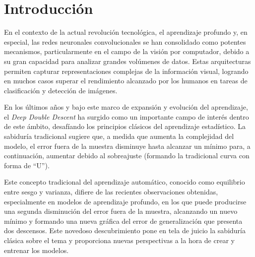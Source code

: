 %


\chapter{Introducción}

En el contexto de la actual revolución tecnológica, el aprendizaje profundo y, en especial, las redes neuronales convolucionales se han consolidado como potentes mecanismos, particularmente en el campo de la visión por computador, debido a su gran capacidad para analizar grandes volúmenes de datos. Estas arquitecturas permiten capturar representaciones complejas de la información visual, logrando en muchos casos superar el rendimiento alcanzado por los humanos en tareas de clasificación y detección de imágenes.

En los últimos años y bajo este marco de expansión y evolución del aprendizaje, el \emph{Deep Double Descent} ha surgido como un importante campo de interés dentro de este ámbito, desafíando los principios clásicos del aprendizaje estadístico. La sabiduría tradicional sugiere que, a medida que aumenta la complejidad del modelo, el error fuera de la muestra disminuye hasta alcanzar un mínimo para, a continuación, aumentar debido al sobreajuste (formando la tradicional curva con forma de ``U'').

Este concepto tradicional del aprendizaje automático, conocido como equilibrio entre sesgo y varianza, difiere de las recientes observaciones obtenidas, especialmente en modelos de aprendizaje profundo, en los que puede producirse una segunda disminución del error fuera de la muestra, alcanzando un nuevo mínimo y formando una nueva gráfica del error de generalización que presenta dos descensos. Este novedoso descubrimiento pone en tela de juicio la sabiduría clásica sobre el tema y proporciona nuevas perspectivas a la hora de crear y entrenar los modelos.

